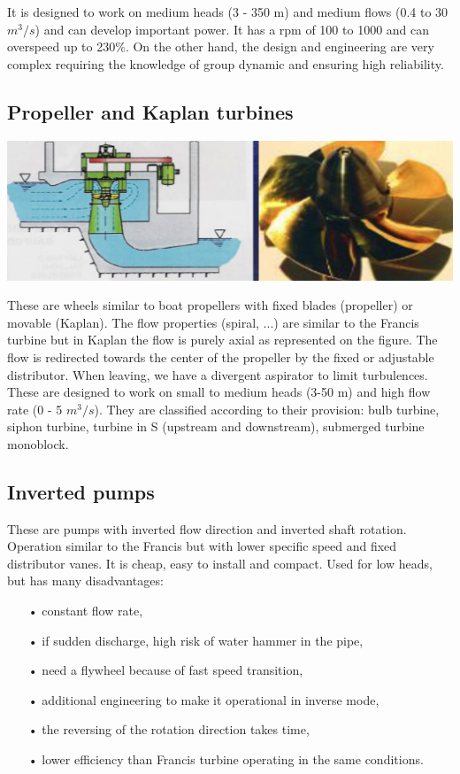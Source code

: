 It is designed to work on medium heads (3 - 350 m) and medium flows (0.4 to 30 $m^3/s$) and can develop important power. It has a rpm of 100 to 1000 and can overspeed up to 230\%. On the other hand, the design and engineering are very complex requiring the knowledge of group dynamic and ensuring high reliability. 

\subsection{Propeller and Kaplan turbines}
\begin{center}
\includegraphics[scale=0.4]{ch4/9}
\end{center}

These are wheels similar to boat propellers with fixed blades (propeller) or movable (Kaplan). The flow properties (spiral, ...) are similar to the Francis turbine but in Kaplan the flow is purely axial as represented on the figure. The flow is redirected towards the center of the propeller by the fixed or adjustable distributor. When leaving, we have a divergent aspirator to limit turbulences. \\

These are designed to work on small to medium heads (3-50 m) and high flow rate (0 - 5 $m^3/s$). They are classified according to their provision: bulb turbine, siphon turbine, turbine in S (upstream and downstream), submerged turbine monoblock. 

\subsection{Inverted pumps}
These are pumps with inverted flow direction and inverted shaft rotation. Operation similar to the Francis but with lower specific speed and fixed distributor vanes. It is cheap, easy to install and compact. Used for low heads, but has many disadvantages: 

\begin{itemize}
\item[•] constant flow rate,
\item[•] if sudden discharge, high risk of water hammer in the pipe,
\item[•] need a flywheel because of fast speed transition,
\item[•] additional engineering to make it operational in inverse mode, 
\item[•] the reversing of the rotation direction takes time,
\item[•] lower efficiency than Francis turbine operating in the same conditions. 
\end{itemize}


